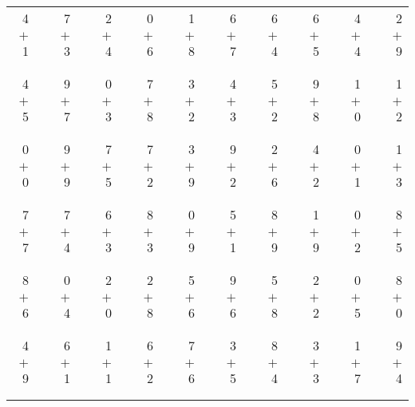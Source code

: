 \documentclass[12pt, letterpaper]{article}
\begin{document}
\begin{tabular}{rrrrrrrrrrrrrrrrrrr}
4 & & 7 & & 2 & & 0 & & 1 & & 6 & & 6 & & 6 & & 4 & & 2\\
$+$ 1 & & $+$ 3 & & $+$ 4 & & $+$ 6 & & $+$ 8 & & $+$ 7 & & $+$ 4 & & $+$ 5 & & $+$ 4 & & $+$ 9\\
\cline{1-1} \cline{3-3} \cline{5-5} \cline{7-7} \cline{9-9} \cline{11-11} \cline{13-13} \cline{15-15} \cline{17-17} \cline{19-19} \\ \\
4 & & 9 & & 0 & & 7 & & 3 & & 4 & & 5 & & 9 & & 1 & & 1\\
$+$ 5 & & $+$ 7 & & $+$ 3 & & $+$ 8 & & $+$ 2 & & $+$ 3 & & $+$ 2 & & $+$ 8 & & $+$ 0 & & $+$ 2\\
\cline{1-1} \cline{3-3} \cline{5-5} \cline{7-7} \cline{9-9} \cline{11-11} \cline{13-13} \cline{15-15} \cline{17-17} \cline{19-19} \\ \\
0 & & 9 & & 7 & & 7 & & 3 & & 9 & & 2 & & 4 & & 0 & & 1\\
$+$ 0 & & $+$ 9 & & $+$ 5 & & $+$ 2 & & $+$ 9 & & $+$ 2 & & $+$ 6 & & $+$ 2 & & $+$ 1 & & $+$ 3\\
\cline{1-1} \cline{3-3} \cline{5-5} \cline{7-7} \cline{9-9} \cline{11-11} \cline{13-13} \cline{15-15} \cline{17-17} \cline{19-19} \\ \\
7 & & 7 & & 6 & & 8 & & 0 & & 5 & & 8 & & 1 & & 0 & & 8\\
$+$ 7 & & $+$ 4 & & $+$ 3 & & $+$ 3 & & $+$ 9 & & $+$ 1 & & $+$ 9 & & $+$ 9 & & $+$ 2 & & $+$ 5\\
\cline{1-1} \cline{3-3} \cline{5-5} \cline{7-7} \cline{9-9} \cline{11-11} \cline{13-13} \cline{15-15} \cline{17-17} \cline{19-19} \\ \\
8 & & 0 & & 2 & & 2 & & 5 & & 9 & & 5 & & 2 & & 0 & & 8\\
$+$ 6 & & $+$ 4 & & $+$ 0 & & $+$ 8 & & $+$ 6 & & $+$ 6 & & $+$ 8 & & $+$ 2 & & $+$ 5 & & $+$ 0\\
\cline{1-1} \cline{3-3} \cline{5-5} \cline{7-7} \cline{9-9} \cline{11-11} \cline{13-13} \cline{15-15} \cline{17-17} \cline{19-19} \\ \\
4 & & 6 & & 1 & & 6 & & 7 & & 3 & & 8 & & 3 & & 1 & & 9\\
$+$ 9 & & $+$ 1 & & $+$ 1 & & $+$ 2 & & $+$ 6 & & $+$ 5 & & $+$ 4 & & $+$ 3 & & $+$ 7 & & $+$ 4\\
\cline{1-1} \cline{3-3} \cline{5-5} \cline{7-7} \cline{9-9} \cline{11-11} \cline{13-13} \cline{15-15} \cline{17-17} \cline{19-19} \\ \\

\end{tabular}
\end{document}
